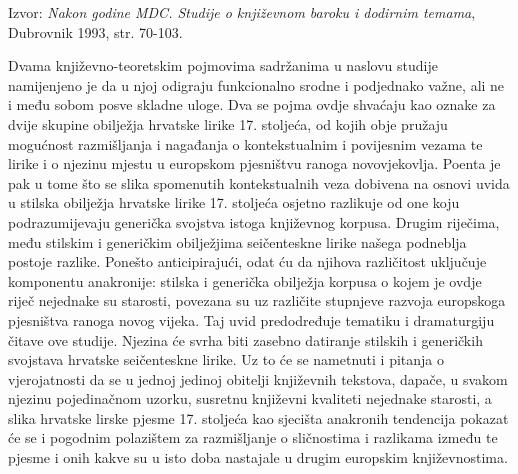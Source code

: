 \documentclass[a4paper,12pt,twoside]{report}
\begin{document}
{\small Izvor: \textit{Nakon godine MDC. Studije o književnom baroku i dodirnim temama}, Dubrovnik 1993, str. 70-103.}

\medskip

\noindent Dvama književno-teoretskim pojmovima sadržanima u naslovu studije namijenjeno je da u njoj odigraju funkcionalno srodne i podjednako važne, ali ne i među sobom posve skladne uloge. Dva se pojma ovdje shvaćaju kao oznake za dvije skupine obilježja hrvatske lirike 17. stoljeća, od kojih obje pružaju mogućnost razmišljanja i nagađanja o kontekstualnim i povijesnim vezama te lirike i o njezinu mjestu u europskom pjesništvu ranoga novovjekovlja. Poenta je pak u tome što se slika spomenutih kontekstualnih veza dobivena na osnovi uvida u stilska obilježja hrvatske lirike 17. stoljeća osjetno razlikuje od one koju podrazumijevaju generička svojstva istoga književnog korpusa. Drugim riječima, među stilskim i generičkim obilježjima seičenteskne lirike našega podneblja postoje razlike. Ponešto anticipirajući, odat ću da njihova različitost uključuje komponentu anakronije: stilska i generička obilježja korpusa o kojem je ovdje riječ nejednake su starosti, povezana su uz različite stupnjeve razvoja europskoga pjesništva ranoga novog vijeka. Taj uvid predodređuje tematiku i dramaturgiju čitave ove studije. Njezina će svrha biti zasebno datiranje stilskih i generičkih svojstava hrvatske seičenteskne lirike. Uz to će se nametnuti i pitanja o vjerojatnosti da se u jednoj jedinoj obitelji književnih tekstova, dapače, u svakom njezinu pojedinačnom uzorku, susretnu književni kvaliteti nejednake starosti, a slika hrvatske lirske pjesme 17. stoljeća kao sjecišta anakronih tendencija pokazat će se i pogodnim polazištem za razmišljanje o sličnostima i razlikama između te pjesme i onih kakve su u isto doba nastajale u drugim europskim književnostima. 
\end{document}
